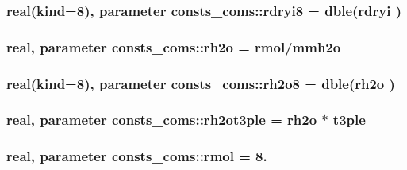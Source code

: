 \subsubsection[{\texorpdfstring{rdryi8}{rdryi8}}]{\setlength{\rightskip}{0pt plus 5cm}real(kind=8), parameter consts\+\_\+coms\+::rdryi8 = dble({\bf rdryi} )}\hypertarget{namespaceconsts__coms_a7556798541293b5d2af6de7efad9c79a}{}\label{namespaceconsts__coms_a7556798541293b5d2af6de7efad9c79a}
\subsubsection[{\texorpdfstring{rh2o}{rh2o}}]{\setlength{\rightskip}{0pt plus 5cm}real, parameter consts\+\_\+coms\+::rh2o = {\bf rmol}/{\bf mmh2o}}\hypertarget{namespaceconsts__coms_ac3c72bd757c228e71a76062364a19c06}{}\label{namespaceconsts__coms_ac3c72bd757c228e71a76062364a19c06}
\subsubsection[{\texorpdfstring{rh2o8}{rh2o8}}]{\setlength{\rightskip}{0pt plus 5cm}real(kind=8), parameter consts\+\_\+coms\+::rh2o8 = dble({\bf rh2o} )}\hypertarget{namespaceconsts__coms_ad9681369cddf5955b3bac4ce765a6c61}{}\label{namespaceconsts__coms_ad9681369cddf5955b3bac4ce765a6c61}
\subsubsection[{\texorpdfstring{rh2ot3ple}{rh2ot3ple}}]{\setlength{\rightskip}{0pt plus 5cm}real, parameter consts\+\_\+coms\+::rh2ot3ple = {\bf rh2o} $\ast$ {\bf t3ple}}\hypertarget{namespaceconsts__coms_a59fef76536ae1c8cf0ed4067acdcebf4}{}\label{namespaceconsts__coms_a59fef76536ae1c8cf0ed4067acdcebf4}
\subsubsection[{\texorpdfstring{rmol}{rmol}}]{\setlength{\rightskip}{0pt plus 5cm}real, parameter consts\+\_\+coms\+::rmol = 8.}\hypertarget{namespaceconsts__coms_ada5d8a1334128cdd95a8a4e15c149599}{}\label{namespaceconsts__coms_ada5d8a1334128cdd95a8a4e15c149599}
